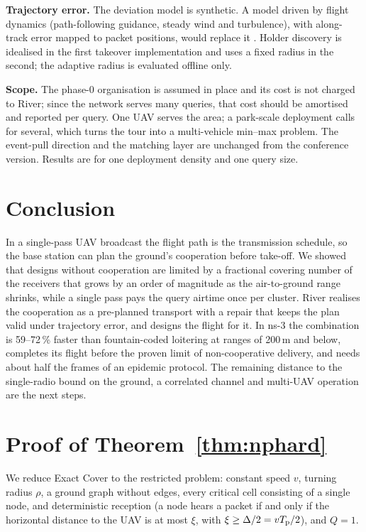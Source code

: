 \textbf{Trajectory error.} The deviation model is synthetic. A model driven by flight dynamics (path-following guidance,
steady wind and turbulence), with along-track error mapped to packet positions, would replace it . Holder
discovery is idealised in the first takeover implementation and uses a fixed radius in the second; the adaptive radius
is evaluated offline only.

\textbf{Scope.} The phase-0 organisation is assumed in place and its cost is not charged to River; since the network
serves many queries, that cost should be amortised and reported per query. One UAV serves the area; a park-scale
deployment calls for several, which turns the tour into a multi-vehicle min--max problem. The event-pull direction and
the matching layer are unchanged from the conference version. Results are for one deployment density and one query size.

\section{Conclusion}
In a single-pass UAV broadcast the flight path is the transmission schedule, so the base station can plan the ground's
cooperation before take-off. We showed that designs without cooperation are limited by a fractional covering number of
the receivers that grows by an order of magnitude as the air-to-ground range shrinks, while a single pass pays the query
airtime once per cluster. River realises the cooperation as a pre-planned transport with a repair that keeps the plan
valid under trajectory error, and \lmtour{} designs the flight for it. In ns-3 the combination is 59--72\,\% faster than
fountain-coded loitering at ranges of 200\,m and below, completes its flight before the proven limit of non-cooperative
delivery, and needs about half the frames of an epidemic protocol. The remaining distance to the single-radio bound on
the ground, a correlated channel and multi-UAV operation are the next steps.

\appendices
\section{Proof of Theorem~\ref{thm:nphard}}\label{app:nphard}
We reduce Exact Cover to the restricted problem: constant speed $v$, turning radius $\rho$, a ground graph without
edges, every critical cell consisting of a single node, and deterministic reception (a node hears a packet if and only
if the horizontal distance to the UAV is at most $\xi$, with $\xi\ge\Delta/2=vT_{\mathrm p}/2$), and $Q=1$.

